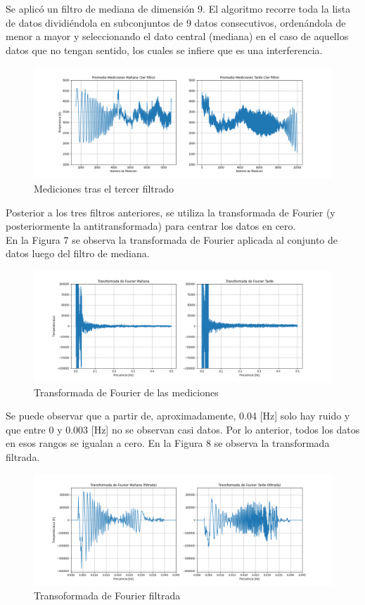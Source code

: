 Se aplicó un filtro de mediana de dimensión 9. El algoritmo recorre toda la lista de datos dividiéndola en subconjuntos de 9 datos consecutivos, ordenándola de menor a mayor y seleccionando el dato central (mediana) en el caso de aquellos datos que no tengan sentido, los cuales se infiere que es una interferencia.
\begin{figure}[H]
\centering
\includegraphics[scale=0.4]{img/img/inf4graf5.png}
\caption{\label{fig:Grafico} Mediciones tras el tercer filtrado}
\end{figure}
Posterior a los tres filtros anteriores, se utiliza la transformada de Fourier (y posteriormente la antitransformada) para centrar los datos en cero.\\
En la Figura 7 se observa la transformada de Fourier aplicada al conjunto de datos luego del filtro de mediana.
\begin{figure}[H]
\centering
\includegraphics[scale=0.4]{img/img/inf4graf6.png}
\caption{\label{fig:Grafico} Transformada de Fourier de las mediciones}
\end{figure}
Se puede observar que a partir de, aproximadamente, 0.04 [Hz] solo hay ruido y que entre 0 y 0.003 [Hz] no se observan casi datos. Por lo anterior, todos los datos en esos rangos se igualan a cero. En la Figura 8 se observa la transformada filtrada.
\begin{figure}[H]
\centering
\includegraphics[scale=0.4]{img/img/inf4graf7.png}
\caption{\label{fig:Grafico} Transoformada de Fourier filtrada}
\end{figure}

